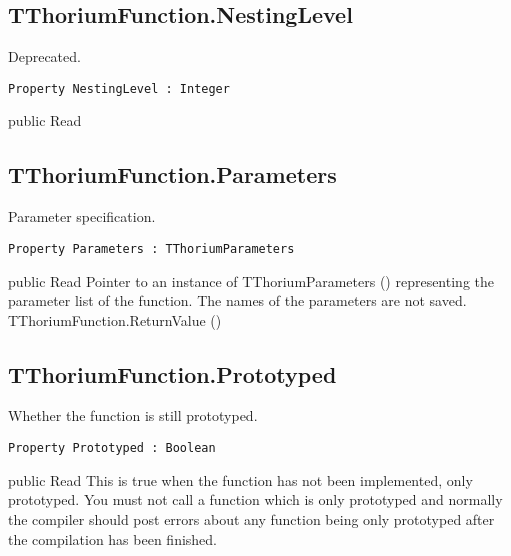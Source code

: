 \subsection{TThoriumFunction.NestingLevel}
\label{thoriumcorepkg:thorium:tthoriumfunction:nestinglevel}
\begin{FPCList}
\Synopsis
Deprecated.\Declaration 

\begin{verbatim}
Property NestingLevel : Integer
\end{verbatim}
\Visibility
public
\Access
Read
\end{FPCList}
\subsection{TThoriumFunction.Parameters}
\label{thoriumcorepkg:thorium:tthoriumfunction:parameters}
\begin{FPCList}
\Synopsis
Parameter specification.\Declaration 

\begin{verbatim}
Property Parameters : TThoriumParameters
\end{verbatim}
\Visibility
public
\Access
Read
\Description
Pointer to an instance of TThoriumParameters (\pageref{thoriumcorepkg:thorium:tthoriumparameters}) representing the parameter list of the function. The names of the parameters are not saved.\SeeAlso
TThoriumFunction.ReturnValue (\pageref{thoriumcorepkg:thorium:tthoriumfunction})\end{FPCList}
\subsection{TThoriumFunction.Prototyped}
\label{thoriumcorepkg:thorium:tthoriumfunction:prototyped}
\begin{FPCList}
\Synopsis
Whether the function is still prototyped.\Declaration 

\begin{verbatim}
Property Prototyped : Boolean
\end{verbatim}
\Visibility
public
\Access
Read
\Description
This is true when the function has not been implemented, only prototyped. You must not call a function which is only prototyped and normally the compiler should post errors about any function being only prototyped after the compilation has been finished.\end{FPCList}

